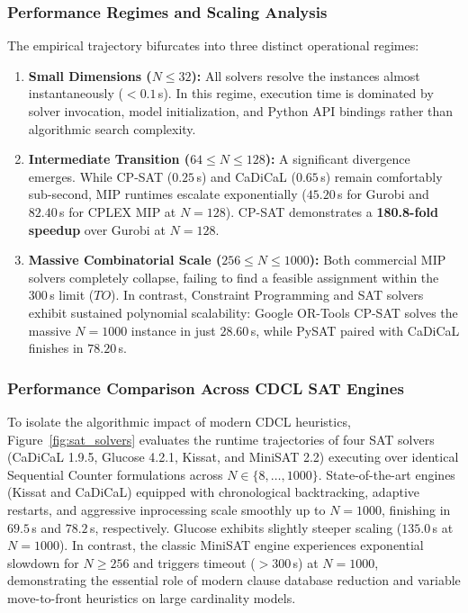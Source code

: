 \documentclass[a4paper,fleqn]{cas-sc}
\begin{document}
\subsubsection{Performance Regimes and Scaling Analysis}
The empirical trajectory bifurcates into three distinct operational regimes:
\begin{enumerate}
    \item \textbf{Small Dimensions ($N \le 32$):} All solvers resolve the instances almost instantaneously ($< 0.1$\,s). In this regime, execution time is dominated by solver invocation, model initialization, and Python API bindings rather than algorithmic search complexity.
    \item \textbf{Intermediate Transition ($64 \le N \le 128$):} A significant divergence emerges. While CP-SAT ($0.25$\,s) and CaDiCaL ($0.65$\,s) remain comfortably sub-second, MIP runtimes escalate exponentially ($45.20$\,s for Gurobi and $82.40$\,s for CPLEX MIP at $N = 128$). CP-SAT demonstrates a \textbf{180.8-fold speedup} over Gurobi at $N = 128$.
    \item \textbf{Massive Combinatorial Scale ($256 \le N \le 1000$):} Both commercial MIP solvers completely collapse, failing to find a feasible assignment within the 300\,s limit ($TO$). In contrast, Constraint Programming and SAT solvers exhibit sustained polynomial scalability: Google OR-Tools CP-SAT solves the massive $N = 1000$ instance in just $28.60$\,s, while PySAT paired with CaDiCaL finishes in $78.20$\,s.
\end{enumerate}

\subsubsection{Performance Comparison Across CDCL SAT Engines}
To isolate the algorithmic impact of modern CDCL heuristics, Figure~\ref{fig:sat_solvers} evaluates the runtime trajectories of four SAT solvers (CaDiCaL 1.9.5, Glucose 4.2.1, Kissat, and MiniSAT 2.2) executing over identical Sequential Counter formulations across $N \in \{8, \dots, 1000\}$. State-of-the-art engines (Kissat and CaDiCaL) equipped with chronological backtracking, adaptive restarts, and aggressive inprocessing scale smoothly up to $N = 1000$, finishing in $69.5$\,s and $78.2$\,s, respectively. Glucose exhibits slightly steeper scaling ($135.0$\,s at $N = 1000$). In contrast, the classic MiniSAT engine experiences exponential slowdown for $N \ge 256$ and triggers timeout ($>300$\,s) at $N = 1000$, demonstrating the essential role of modern clause database reduction and variable move-to-front heuristics on large cardinality models.
\end{document}
